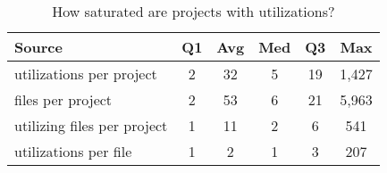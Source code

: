 \begin{table}[ht]
\begin{center}
\begin{small}
\caption{How saturated are projects with utilizations?}
\label{table:saturation}

\begin{tabular}{l|ccccc}
\toprule
\textbf{Source} & \textbf{Q1} & \textbf{Avg} & \textbf{Med} & \textbf{Q3} & \textbf{Max} \\
 \midrule \bigstrut
utilizations per project & 2 & 32 & 5 & 19 & 1,427 \\
 \midrule \bigstrut
files per project & 2 & 53 & 6 & 21 & 5,963 \\
 \midrule \bigstrut
utilizing files per project & 1 & 11 & 2 & 6 & 541 \\
 \midrule \bigstrut
utilizations per file & 1 & 2 & 1 & 3 & 207 \\
\bottomrule
\end{tabular}
\end{small}
\end{center}
\vspace{-12pt}
\end{table}
